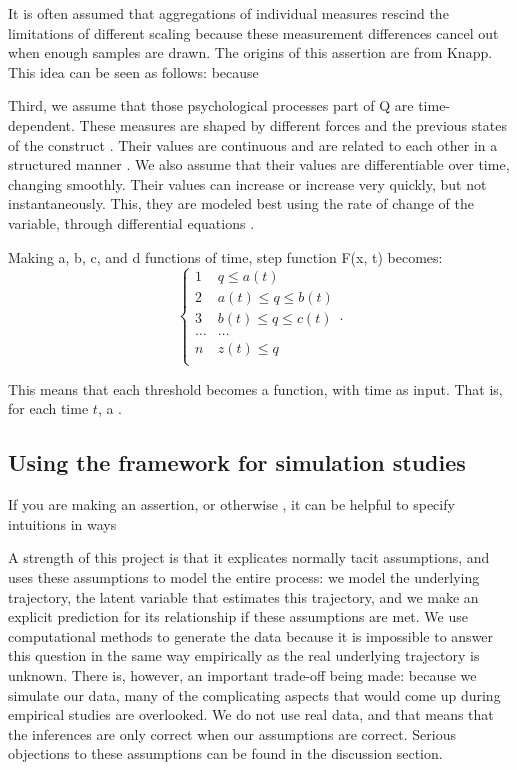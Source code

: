 \documentclass[utf8]{FrontiersinVancouver}
\begin{document}
It is often assumed that aggregations of individual measures rescind the limitations of different scaling because these measurement differences cancel out when enough samples are drawn. The origins of this assertion are from Knapp. This idea can be seen as follows: because 

Third, we assume that those psychological processes part of Q are time-dependent. These measures are shaped by different forces and the previous states of the construct \citep{olthofComplexityPsychologicalSelfratings2020b}. Their values are continuous and are related to each other in a structured manner \citep{bokerConsequencesContinuityHunt2002}. We also assume that their values are differentiable over time, changing smoothly. Their values can increase or increase very quickly, but not instantaneously. This, they are modeled best using the rate of change of the variable, through differential equations \citep{molenaarNewPersonSpecificParadigm2009}.

Making a, b, c, and d functions of time, step function F(x, t) becomes: 
\[
\begin{cases} 
    1 & q \leq a(t)\\
    2 & a(t) \leq q \leq b(t)\\
    3 & b(t) \leq q \leq c(t)\\
    \ldots & \ldots\\    
    n & z(t) \leq q\\
\end{cases}.
\]

This means that each threshold becomes a function, with time as input. That is, for each time $t$, a . 


\subsection{Using the framework for simulation studies}
If you are making an assertion, or otherwise , it can be helpful to specify intuitions in ways 

A strength of this project is that it explicates normally tacit assumptions, and uses these assumptions to model the entire process: we model the underlying trajectory, the latent variable that estimates this trajectory, and we make an explicit prediction for its relationship if these assumptions are met. We use computational methods to generate the data because it is impossible to answer this question in the same way empirically as the real underlying trajectory is unknown. There is, however, an important trade-off being made: because we simulate our data, many of the complicating aspects that would come up during empirical studies are overlooked. We do not use real data, and that means that the inferences are only correct when our assumptions are correct. Serious objections to these assumptions can be found in the discussion section.
\end{document}
